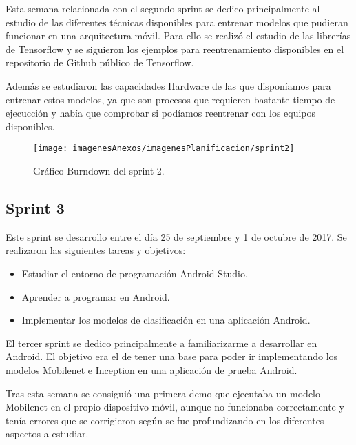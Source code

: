 Esta semana relacionada con el segundo sprint se dedico principalmente al estudio de las diferentes técnicas disponibles para entrenar modelos que pudieran funcionar en una arquitectura móvil. Para ello se realizó el estudio de las librerías de Tensorflow y se siguieron los ejemplos para reentrenamiento disponibles en el repositorio de Github público de Tensorflow. 

Además se estudiaron las capacidades Hardware de las que disponíamos para entrenar estos modelos, ya que son procesos que requieren bastante tiempo de ejecucción y había que comprobar si podíamos reentrenar con los equipos disponibles.

\begin{figure}[h]
    \begin{center}%
        \begin{center}%
          \texttt{[image: imagenesAnexos/imagenesPlanificacion/sprint2]}%
          \caption{Gráfico Burndown del sprint 2.}%
          \label{figSprint2}%
        \end{center}%
  	\end{center}%
\end{figure}%

\subsection{Sprint 3}

Este sprint se desarrollo entre el día 25 de septiembre y 1 de octubre de 2017. Se realizaron las siguientes tareas y objetivos:

\begin{itemize}
	\item Estudiar el entorno de programación Android Studio.
	\item Aprender a programar en Android.
	\item Implementar los modelos de clasificación en una aplicación Android.
\end{itemize}

El tercer sprint se dedico principalmente a familiarizarme a desarrollar en Android. El objetivo era el de tener una base para poder ir implementando los modelos Mobilenet e Inception en una aplicación de prueba Android.

Tras esta semana se consiguió una primera demo que ejecutaba un modelo Mobilenet en el propio dispositivo móvil, aunque no funcionaba correctamente y tenía errores que se corrigieron según se fue profundizando en los diferentes aspectos a estudiar.

